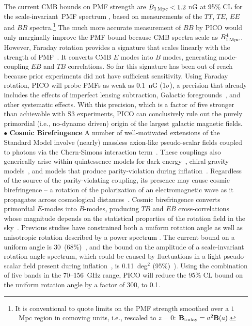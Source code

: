 \documentclass[PICOReport.tex]{subfiles}
\begin{document}
The current CMB bounds on PMF strength are $B_{\rm 1\,Mpc}<1.2$ nG at 95\% CL for the scale-invariant~PMF spectrum \cite{Planck2015PMF,Kunze2015,Chluba2015PMF,Zucca:2016iur}, based on measurements of the $TT$, $TE$, $EE$ and $BB$ spectra.\footnote{It is conventional to quote limits on the PMF strength smoothed over a $1$~Mpc region in comoving units,  i.e., rescaled to $z=0$: $\mathbf{B}_{\rm today} = a^2\mathbf{B}(a)$.} 
The much more accurate measurement of $BB$ by PICO would only marginally improve the PMF bound because CMB spectra scale as $B^4_{\rm 1\,Mpc}$. However, Faraday rotation provides a signature that scales linearly with the strength of PMF~\cite{Kosowsky:1996yc}. It converts CMB $E$ modes into $B$ modes, generating mode-coupling $EB$ and $TB$ correlations. So far this signature has been out of reach because prior experiments did not have sufficient sensitivity. Using Faraday rotation, PICO will probe PMFs as weak as 0.1~nG ($1\sigma$), a precision that already includes the effects of imperfect lensing subtraction, Galactic foregrounds~\cite{Oppermann:2011td,De:2013dra,Pogosian:2013dya}, and other systematic effects. With this precision, which is a factor of five stronger than achievable with S3 experiments, PICO can conclusively rule out the purely primordial (i.e., no-dynamo driven) origin of the largest galactic magnetic fields. \\
%
$\bullet$ {\bf Cosmic Birefringence} \hspace{0.1in}
A number of well-motivated extensions of the Standard Model involve (nearly) massless axion-like pseudo-scalar fields coupled to photons via the Chern-Simons interaction term~\citep{Freese:1990rb,Frieman:1995pm,Carroll:1998zi,Kaloper:2005aj}. These couplings also generically arise within quintessence models for dark energy~\citep{Carroll:1998zi}, chiral-gravity models~\citep{2008PhRvL.101n1101C}, and models that produce parity-violation during inflation~\cite{Gluscevic:2010vv}. Regardless of the source of the parity-violating coupling, its presence may cause cosmic birefringence -- a rotation of the polarization of an electromagnetic wave as it propagates across cosmological distances~\cite{Harari:1992ea,Carroll:1989vb,Carroll:1998zi}. Cosmic birefringence converts primordial $E$-modes into $B$-modes, producing $TB$ and $EB$ cross-correlations whose magnitude depends on the statistical properties of the rotation field in the sky~\cite{Kamionkowski:2008fp,Gluscevic:2009mm,Gluscevic:2012me}. Previous studies have constrained both a uniform rotation angle as well as anisotropic rotation described by a power spectrum \cite{Gluscevic:2012me}. The current bound on a uniform angle is 30\arcmin\ (68\%)~\cite{Planck2016_XLIX}, and the bound on the amplitude of a scale-invariant rotation angle spectrum, which could be caused by fluctuations in a light pseudo-scalar field present during inflation~\cite{Pospelov:2008gg}, is 0.11~deg$^2$ (95\%)~\citep{Array:2017rlf}). Using the combination of five bands in the 70--156~GHz range, PICO will reduce the 95\% CL bound on the uniform rotation angle by a factor of 300, to 0.1\arcmin.  
\end{document}
